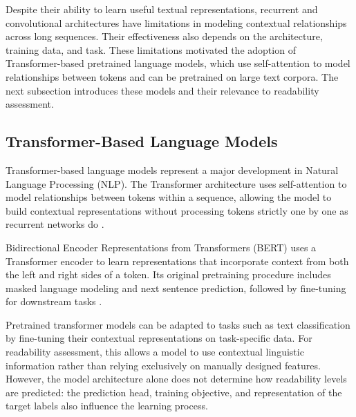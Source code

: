 \documentclass[12pt]{report}
\begin{document}
Despite their ability to learn useful textual representations, recurrent and convolutional architectures have limitations in modeling contextual relationships across long sequences. Their effectiveness also depends on the architecture, training data, and task. These limitations motivated the adoption of Transformer-based pretrained language models, which use self-attention to model relationships between tokens and can be pretrained on large text corpora. The next subsection introduces these models and their relevance to readability assessment.


\subsection{Transformer-Based Language Models}

Transformer-based language models represent a major development in Natural Language Processing (NLP). The Transformer architecture uses self-attention to model relationships between tokens within a sequence, allowing the model to build contextual representations without processing tokens strictly one by one as recurrent networks do \cite{vaswani2017attention}.

Bidirectional Encoder Representations from Transformers (BERT) uses a Transformer encoder to learn representations that incorporate context from both the left and right sides of a token. Its original pretraining procedure includes masked language modeling and next sentence prediction, followed by fine-tuning for downstream tasks \cite{devlin2019bert}.

Pretrained transformer models can be adapted to tasks such as text classification by fine-tuning their contextual representations on task-specific data. For readability assessment, this allows a model to use contextual linguistic information rather than relying exclusively on manually designed features. However, the model architecture alone does not determine how readability levels are predicted: the prediction head, training objective, and representation of the target labels also influence the learning process.
\end{document}
